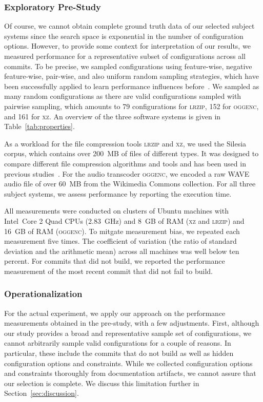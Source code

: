 \documentclass[sigconf]{acmart}
\begin{document}
	\subsubsection{Exploratory Pre-Study}
	Of course, we cannot obtain complete ground truth data of our selected subject systems since the search space is exponential in the number of configuration options. 
	However, to provide some context for interpretation of our results, we measured performance for a representative subset of configurations across all commits. To be precise, we sampled configurations using feature-wise, negative feature-wise, pair-wise, and also uniform random sampling strategies, which have been successfully applied to learn performance influences before~\cite{alves_sampling_2020}. We sampled as many random configurations as there are valid configurations sampled with pairwise sampling, which amounts to 79 configurations for \textsc{lrzip}, 152 for \textsc{oggenc}, and 161 for \textsc{xz}. An overview of the three software systems is given in Table~\ref{tab:properties}.
	
	As a workload for the file compression tools \textsc{lrzip} and \textsc{xz}, we used the Silesia corpus, which contains over 200~MB of files of different types. It was designed to compare different file compression algorithms and tools and has been used in previous studies~\cite{muhlbauer_accurate_2019}. For the audio transcoder \textsc{oggenc}, we encoded a raw WAVE audio file of over 60~MB from the Wikimedia Commons collection. For all three subject systems, we assess performance by reporting the execution time.
	
	All measurements were conducted on clusters of Ubuntu machines with Intel~Core
	2 Quad CPUs (2.83~GHz) and 8~GB of RAM (\textsc{xz} and \textsc{lrzip}) and 16~GB of RAM (\textsc{oggenc}). To mitgate measurement bias, we repeated each measurement five times. The coefficient of variation (the ratio of standard deviation and the arithmetic mean) across all machines was well below ten percent. For commits that did not build, we reported the performance measurement of the most recent commit that did not fail to build.
	
	\subsubsection{Operationalization}\label{sec:rq2_operationalization}
	For the actual experiment, we apply our approach on the performance measurements obtained in the pre-study, with a few adjustments.
	First, although our study provides a broad and representative sample set of configurations, we cannot arbitrarily sample valid configurations for a couple of reasons. In particular, these include the commits that do not build as well as hidden configuration options and constraints. While we collected configuration options and constraints thoroughly from documentation artifacts, we cannot assure that our selection is complete. We discuss this limitation further in Section~\ref{sec:discussion}.
	
\end{document}
